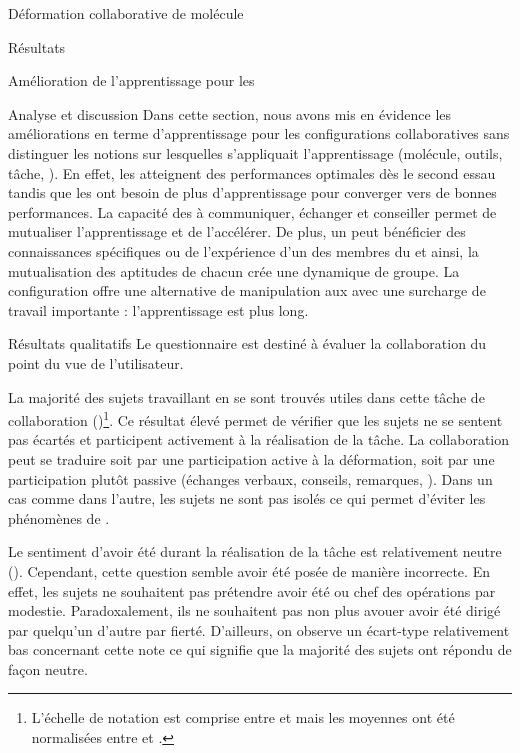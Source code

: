 \documentclass[myfrancais,ngerman,english,frenchb]{mythesis}
\begin{document}
\begin{mychapter}{Déformation collaborative de molécule}
\begin{mysection}{Résultats}
\begin{mysubsection}{Amélioration de l'apprentissage pour les }
\begin{mysubsubsection}{Analyse et discussion}
					Dans cette section, nous avons mis en évidence les améliorations en terme d'apprentissage pour les configurations collaboratives sans distinguer les notions sur lesquelles s'appliquait l'apprentissage (molécule, outils, tâche, \myetc).
					En effet, les  atteignent des performances optimales dès le second essau tandis que les  ont besoin de plus d'apprentissage pour converger vers de bonnes performances.
					La capacité des  à communiquer, échanger et conseiller permet de mutualiser l'apprentissage et de l'accélérer.
					De plus, un  peut bénéficier des connaissances spécifiques ou de l'expérience d'un des membres du  et ainsi, la mutualisation des aptitudes de chacun crée une dynamique de groupe.
					La configuration  offre une alternative de manipulation aux  avec une surcharge de travail importante : l'apprentissage est plus long.
				\end{mysubsubsection}
			\end{mysubsection}
			\begin{mysubsection}{Résultats qualitatifs}
				Le questionnaire est destiné à évaluer la collaboration du point du vue de l'utilisateur.

				La majorité des sujets travaillant en  se sont trouvés utiles dans cette tâche de collaboration ()\footnote{L'échelle de notation est comprise entre  et  mais les moyennes ont été normalisées entre  et .}.
				Ce résultat élevé permet de vérifier que les sujets ne se sentent pas écartés et participent activement à la réalisation de la tâche.
				La collaboration peut se traduire soit par une participation active à la déformation, soit par une participation plutôt passive (échanges verbaux, conseils, remarques, \myetc).
				Dans un cas comme dans l'autre, les sujets ne sont pas isolés ce qui permet d'éviter les phénomènes de .

				Le sentiment d'avoir été  durant la réalisation de la tâche est relativement neutre ().
				Cependant, cette question semble avoir été posée de manière incorrecte.
				En effet, les sujets ne souhaitent pas prétendre avoir été  ou chef des opérations par modestie.
				Paradoxalement, ils ne souhaitent pas non plus avouer avoir été dirigé par quelqu'un d'autre par fierté.
				D'ailleurs, on observe un écart-type relativement bas concernant cette note ce qui signifie que la majorité des sujets ont répondu de façon neutre.


\end{mysubsection}
\end{mysection}
\end{mychapter}
\end{document}
